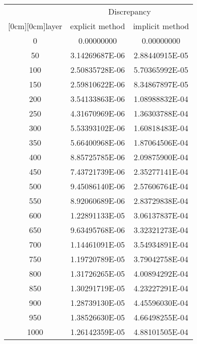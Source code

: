 \documentclass[12pt,a4paper]{article}
\begin{document}
\begin{center}

\begin{tabular}{|c|c|c|}
 \hline
 & \multicolumn{2}{|c|}{Discrepancy} \\
 \cline{2-3}
 \raisebox{1.5ex}[0cm][0cm]{layer}
 & explicit method & implicit method \\
\hline
   0 & 0.00000000     & 0.00000000     \\
\hline
  50 & 3.14269687E-06 & 2.88440915E-05 \\
\hline
 100 & 2.50835728E-06 & 5.70365992E-05 \\
\hline
 150 & 2.59810622E-06 & 8.34867897E-05 \\
\hline
 200 & 3.54133863E-06 & 1.08988832E-04 \\
\hline
 250 & 4.31670969E-06 & 1.36303788E-04 \\
\hline
 300 & 5.53393102E-06 & 1.60818483E-04 \\
\hline
 350 & 5.66400968E-06 & 1.87064506E-04 \\
\hline
 400 & 8.85725785E-06 & 2.09875900E-04 \\
\hline
 450 & 7.43721739E-06 & 2.35277141E-04 \\
\hline
 500 & 9.45086140E-06 & 2.57606764E-04 \\
\hline
 550 & 8.92060689E-06 & 2.83729838E-04 \\
\hline
 600 & 1.22891133E-05 & 3.06137837E-04 \\
\hline
 650 & 9.63495768E-06 & 3.32321273E-04 \\
\hline
 700 & 1.14461091E-05 & 3.54934891E-04 \\
\hline
 750 & 1.19720789E-05 & 3.79042758E-04 \\
\hline
 800 & 1.31726265E-05 & 4.00894292E-04 \\
\hline
 850 & 1.30291719E-05 & 4.23227291E-04 \\
\hline
 900 & 1.28739130E-05 & 4.45596030E-04 \\
\hline
 950 & 1.38526630E-05 & 4.66498255E-04 \\
\hline
1000 & 1.26142359E-05 & 4.88101505E-04 \\
\hline

\end{tabular}

\end{center}
\end{document}
